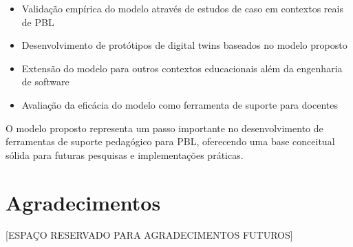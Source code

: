 \documentclass[english, spanish, brazilian]{RBIEarticle} %
\begin{document}
\begin{itemize}
    \item Validação empírica do modelo através de estudos de caso em contextos reais de PBL
    \item Desenvolvimento de protótipos de digital twins baseados no modelo proposto
    \item Extensão do modelo para outros contextos educacionais além da engenharia de software
    \item Avaliação da eficácia do modelo como ferramenta de suporte para docentes
\end{itemize}

O modelo proposto representa um passo importante no desenvolvimento de ferramentas de suporte pedagógico para PBL, oferecendo uma base conceitual sólida para futuras pesquisas e implementações práticas.

\section*{Agradecimentos}

[ESPAÇO RESERVADO PARA AGRADECIMENTOS FUTUROS]


\printbibliography
\end{document}
